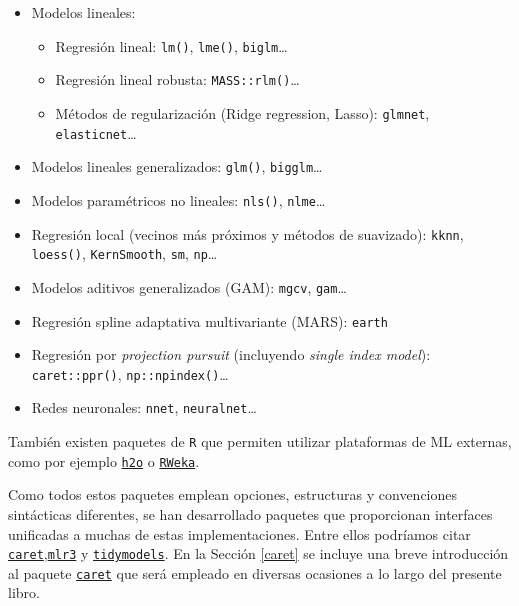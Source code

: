 \documentclass[
  spanish,
]{book}
\theoremstyle{break}
\theoremstyle{definition}
\theoremstyle{definition}
\theoremstyle{definition}
\theoremstyle{remark}
\begin{document}
\begin{itemize}
\item
  Modelos lineales:

  \begin{itemize}
  \item
    Regresión lineal: \texttt{lm()}, \texttt{lme()}, \texttt{biglm}\ldots{}
  \item
    Regresión lineal robusta: \texttt{MASS::rlm()}\ldots{}
  \item
    Métodos de regularización (Ridge regression, Lasso):
    \texttt{glmnet}, \texttt{elasticnet}\ldots{}
  \end{itemize}
\item
  Modelos lineales generalizados: \texttt{glm()}, \texttt{bigglm}\ldots{}
\item
  Modelos paramétricos no lineales: \texttt{nls()}, \texttt{nlme}\ldots{}
\item
  Regresión local (vecinos más próximos y métodos de suavizado):
  \texttt{kknn}, \texttt{loess()}, \texttt{KernSmooth}, \texttt{sm}, \texttt{np}\ldots{}
\item
  Modelos aditivos generalizados (GAM): \texttt{mgcv}, \texttt{gam}\ldots{}
\item
  Regresión spline adaptativa multivariante (MARS): \texttt{earth}
\item
  Regresión por \emph{projection pursuit} (incluyendo \emph{single index model}): \texttt{caret::ppr()}, \texttt{np::npindex()}\ldots{}
\item
  Redes neuronales: \texttt{nnet}, \texttt{neuralnet}\ldots{}
\end{itemize}

También existen paquetes de \texttt{R} que permiten utilizar plataformas de ML externas, como por ejemplo \href{https://github.com/h2oai/h2o-3/tree/master/h2o-r}{\texttt{h2o}} o \href{https://CRAN.R-project.org/package=RWeka}{\texttt{RWeka}}.

Como todos estos paquetes emplean opciones, estructuras y convenciones sintácticas diferentes, se han desarrollado paquetes que proporcionan interfaces unificadas a muchas de estas implementaciones.
Entre ellos podríamos citar \href{https://topepo.github.io/caret}{\texttt{caret}},\href{https://mlr3.mlr-org.com}{\texttt{mlr3}} y \href{https://www.tidymodels.org}{\texttt{tidymodels}}.
En la Sección \ref{caret} se incluye una breve introducción al paquete \href{https://topepo.github.io/caret}{\texttt{caret}} que será empleado en diversas ocasiones a lo largo del presente libro.
\end{document}
